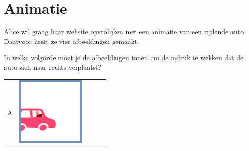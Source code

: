 \documentclass[12pt]{article}
\begin{document}
	\begin{minipage}{\textwidth}
		\section{Animatie}
		Alice wil graag haar website opvrolijken met een animatie van een rijdende auto. Daarvoor heeft ze vier afbeeldingen gemaakt.
		
		In welke volgorde moet je de afbeeldingen tonen om de indruk te wekken dat de auto zich naar rechts verplaatst? 
		
		\begin{table}[H]
			\begin{tabulary}{\linewidth}{|C|CCCC|}
				\hline 
				A &
				\vspace{0.01cm}\includegraphics[width=\linewidth]{option1} &

\end{tabulary}
\end{table}
\end{minipage}
\end{document}
